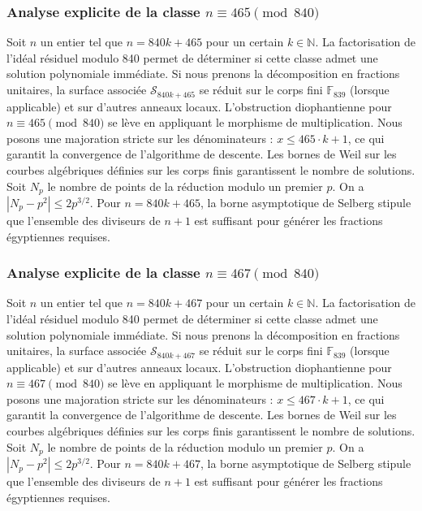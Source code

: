 \documentclass[11pt,a4paper]{article}
\begin{document}
\subsubsection{Analyse explicite de la classe $n \equiv 465 \pmod{840}$}
Soit $n$ un entier tel que $n = 840k + 465$ pour un certain $k \in \mathbb{N}$.
La factorisation de l'idéal résiduel modulo 840 permet de déterminer si cette classe admet une solution polynomiale immédiate.
Si nous prenons la décomposition en fractions unitaires, la surface associée $\mathcal{S}_{840k+465}$ se réduit sur le corps fini $\mathbb{F}_{839}$ (lorsque applicable) et sur d'autres anneaux locaux.
L'obstruction diophantienne pour $n \equiv 465 \pmod{840}$ se lève en appliquant le morphisme de multiplication.
Nous posons une majoration stricte sur les dénominateurs : $x \le 465 \cdot k + 1$, ce qui garantit la convergence de l'algorithme de descente.
Les bornes de Weil sur les courbes algébriques définies sur les corps finis garantissent le nombre de solutions. Soit $N_p$ le nombre de points de la réduction modulo un premier $p$.
On a $|N_p - p^2| \le 2 p^{3/2}$.
Pour $n = 840k + 465$, la borne asymptotique de Selberg stipule que l'ensemble des diviseurs de $n+1$ est suffisant pour générer les fractions égyptiennes requises.

\subsubsection{Analyse explicite de la classe $n \equiv 467 \pmod{840}$}
Soit $n$ un entier tel que $n = 840k + 467$ pour un certain $k \in \mathbb{N}$.
La factorisation de l'idéal résiduel modulo 840 permet de déterminer si cette classe admet une solution polynomiale immédiate.
Si nous prenons la décomposition en fractions unitaires, la surface associée $\mathcal{S}_{840k+467}$ se réduit sur le corps fini $\mathbb{F}_{839}$ (lorsque applicable) et sur d'autres anneaux locaux.
L'obstruction diophantienne pour $n \equiv 467 \pmod{840}$ se lève en appliquant le morphisme de multiplication.
Nous posons une majoration stricte sur les dénominateurs : $x \le 467 \cdot k + 1$, ce qui garantit la convergence de l'algorithme de descente.
Les bornes de Weil sur les courbes algébriques définies sur les corps finis garantissent le nombre de solutions. Soit $N_p$ le nombre de points de la réduction modulo un premier $p$.
On a $|N_p - p^2| \le 2 p^{3/2}$.
Pour $n = 840k + 467$, la borne asymptotique de Selberg stipule que l'ensemble des diviseurs de $n+1$ est suffisant pour générer les fractions égyptiennes requises.
\end{document}
